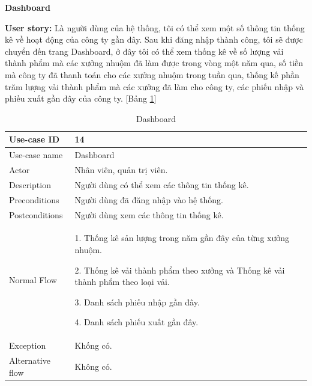 \textbf{Dashboard}\par
\textbf{User story:} Là người dùng của hệ thống, tôi có thể xem một số thông tin thống kê về hoạt động của công ty gần đây. Sau khi đăng nhập thành công, tôi sẽ được chuyển đến trang Dashboard, ở đây tôi có thể xem thống kê về số lượng vải thành phẩm mà các xưởng nhuộm đã làm được trong vòng một năm qua, số tiền mà công ty đã thanh toán cho các xưởng nhuộm trong tuần qua, thống kế phần trăm lượng vải thành phẩm mà các xưởng đã làm cho công ty, các phiếu nhập và phiếu xuất gần đây của công ty. [Bảng \ref{bang14}]
\begin{table}[H]
    \centering
    \begin{tabular}{|m{3cm}|m{10cm}|}
    \hline 
        Use-case ID & 14\\ \hline
        Use-case name & Dashboard\\ \hline
        Actor & Nhân viên, quản trị viên.\\ \hline
        Description & Người dùng có thể xem các thông tin thống kê.\\ \hline
        Preconditions & Người dùng đã đăng nhập vào hệ thống.\\ \hline
        Postconditions & Người dùng xem các thông tin thống kê.\\ \hline
        Normal Flow & 
        1. Thống kê sản lượng trong năm gần đây của từng xưởng nhuộm.\par
        2. Thống kê vải thành phẩm theo xưởng và Thống kê vải thành phẩm theo loại vải.\par
        3. Danh sách phiếu nhập gần đây.\par
        4. Danh sách phiếu xuất gần đây.
        \\ \hline
        Exception & Khống có.\\ \hline
        Alternative flow & Không có.\\ 
    \hline 
    \end{tabular}
    \caption{Dashboard}
    \label{bang14}
\end{table}


